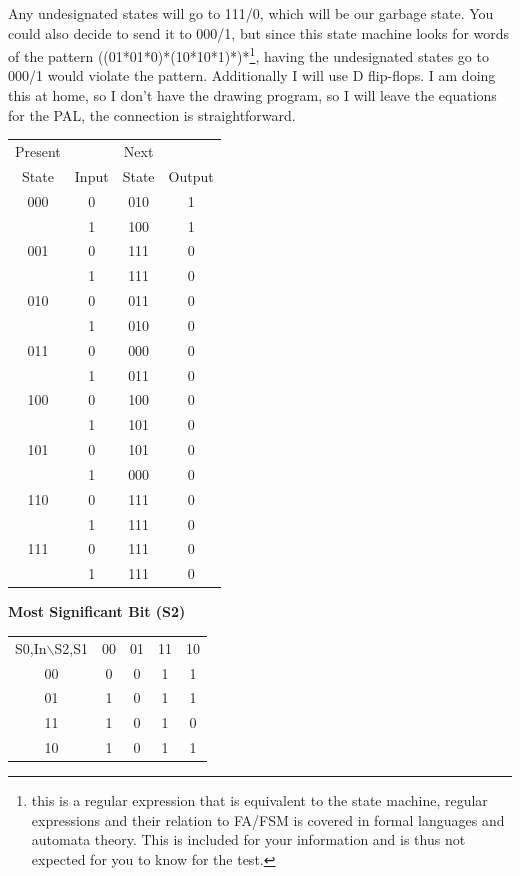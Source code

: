     {\color{ans}
    Any undesignated states will go to 111/0, which will be our garbage state.  You could also decide to send it to 000/1, but since this state machine looks for words of the pattern ((01*01*0)*(10*10*1)*)*\footnote{{\color{ans} this is a regular expression that is equivalent to the state machine, regular expressions and their relation to FA/FSM is covered in formal languages and automata theory.  This is included for your information and is thus not expected for you to know for the test.}}, having the undesignated states go to 000/1 would violate the pattern.  Additionally I will use D flip-flops.  I am doing this at home, so I don't have the drawing program, so I will leave the equations for the PAL, the connection is straightforward.

\twocolumn

    \begin{tabular}{c|c||c|c}
      Present &       & Next  &        \\
      State   & Input & State & Output \\ \hline \hline
      000     & 0     & 010   & 1 \\
              & 1     & 100   & 1 \\ \hline
      001     & 0     & 111   & 0 \\
              & 1     & 111   & 0 \\ \hline
      010     & 0     & 011   & 0 \\
              & 1     & 010   & 0 \\ \hline
      011     & 0     & 000   & 0 \\
              & 1     & 011   & 0 \\ \hline
      100     & 0     & 100   & 0 \\
              & 1     & 101   & 0 \\ \hline
      101     & 0     & 101   & 0 \\
              & 1     & 000   & 0 \\ \hline
      110     & 0     & 111   & 0 \\
              & 1     & 111   & 0 \\ \hline
      111     & 0     & 111   & 0 \\
              & 1     & 111   & 0 \\ \hline
    \end{tabular}

    \textbf{Most Significant Bit (S2)}

    \begin{tabular}{c|c|c|c|c|}
    \multicolumn{1}{c}{S0,In$\backslash$S2,S1} & \multicolumn{1}{c}{00} & \multicolumn{1}{c}{01} & \multicolumn{1}{c}{11} & \multicolumn{1}{c}{10} \\ \cline{2-5}
    00 & 0 & 0 & 1 & 1 \\ \cline{2-5}
    01 & 1 & 0 & 1 & 1 \\ \cline{2-5}
    11 & 1 & 0 & 1 & 0 \\ \cline{2-5}
    10 & 1 & 0 & 1 & 1 \\ \cline{2-5}
    \end{tabular}

}
